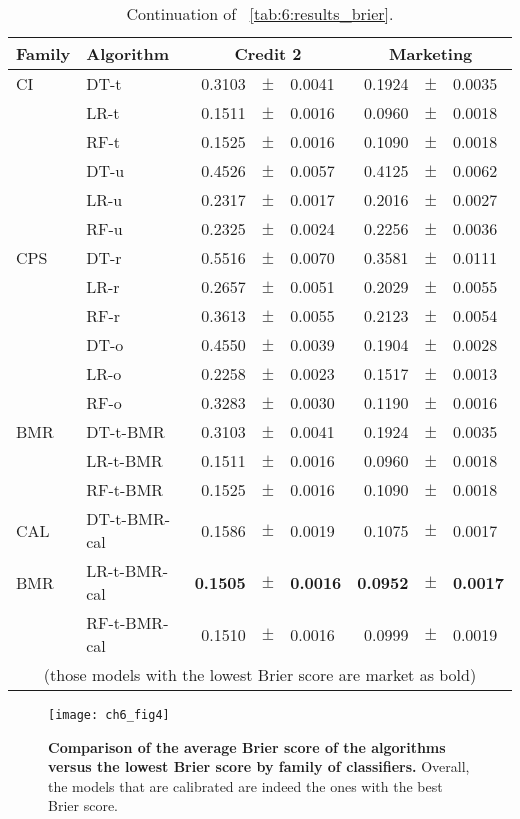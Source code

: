 \begin{table}[!t]
    \centering
    \footnotesize
    \begin{tabular}{l l r@{\hskip 0in}c@{\hskip 0in}l r@{\hskip 0in}c@{\hskip 0in}l  } %
    \hline
    \bf{Family} & \bf{Algorithm} &  \multicolumn{3}{c}{\bf{Credit 2}} 
& \multicolumn{3}{c}{\bf{Marketing}} \\ 
    \hline
CI&DT-t & 0.3103 &$\pm$& 0.0041 & 0.1924 &$\pm$& 0.0035\\ 
&LR-t & 0.1511 &$\pm$& 0.0016 & 0.0960 &$\pm$& 0.0018\\ 
&RF-t & 0.1525 &$\pm$& 0.0016 & 0.1090 &$\pm$& 0.0018\\ 
&DT-u & 0.4526 &$\pm$& 0.0057 & 0.4125 &$\pm$& 0.0062\\ 
&LR-u & 0.2317 &$\pm$& 0.0017 & 0.2016 &$\pm$& 0.0027\\ 
&RF-u & 0.2325 &$\pm$& 0.0024 & 0.2256 &$\pm$& 0.0036\\ 
\hline 
CPS&DT-r & 0.5516 &$\pm$& 0.0070 & 0.3581 &$\pm$& 0.0111\\ 
&LR-r & 0.2657 &$\pm$& 0.0051 & 0.2029 &$\pm$& 0.0055\\ 
&RF-r & 0.3613 &$\pm$& 0.0055 & 0.2123 &$\pm$& 0.0054\\ 
&DT-o & 0.4550 &$\pm$& 0.0039 & 0.1904 &$\pm$& 0.0028\\ 
&LR-o & 0.2258 &$\pm$& 0.0023 & 0.1517 &$\pm$& 0.0013\\ 
&RF-o & 0.3283 &$\pm$& 0.0030 & 0.1190 &$\pm$& 0.0016\\ 
\hline 
BMR&DT-t-BMR & 0.3103 &$\pm$& 0.0041 & 0.1924 &$\pm$& 0.0035\\ 
&LR-t-BMR & 0.1511 &$\pm$& 0.0016 & 0.0960 &$\pm$& 0.0018\\ 
&RF-t-BMR & 0.1525 &$\pm$& 0.0016 & 0.1090 &$\pm$& 0.0018\\ 
\hline 
CAL&DT-t-BMR-cal & 0.1586 &$\pm$& 0.0019 & 0.1075 &$\pm$& 0.0017\\ 
BMR&LR-t-BMR-cal & \bf{0.1505} &\bf{$\pm$}& \bf{0.0016} & \bf{0.0952} &\bf{$\pm$}& \bf{0.0017}\\ 
&RF-t-BMR-cal & 0.1510 &$\pm$& 0.0016 & 0.0999 &$\pm$& 0.0019\\ 
\hline 
  \multicolumn{8}{c}{(those models with the lowest Brier score are market as bold)}
  \end{tabular}
    \caption{Continuation of \tablename{~\ref{tab:6:results_brier}}.}
    \label{tab:6:results_savings2}
  \end{table}
  
\begin{figure}[!t]
  \centering
  \texttt{[image: ch6\_fig4]}
  \caption{\textbf{Comparison of the average Brier score of the algorithms versus the 
    lowest Brier score by family of classifiers.} Overall, the models that are calibrated are 
indeed the ones with the best Brier score.}
  \label{fig:6:comparison_family_brier}
\end{figure}
  
  
  